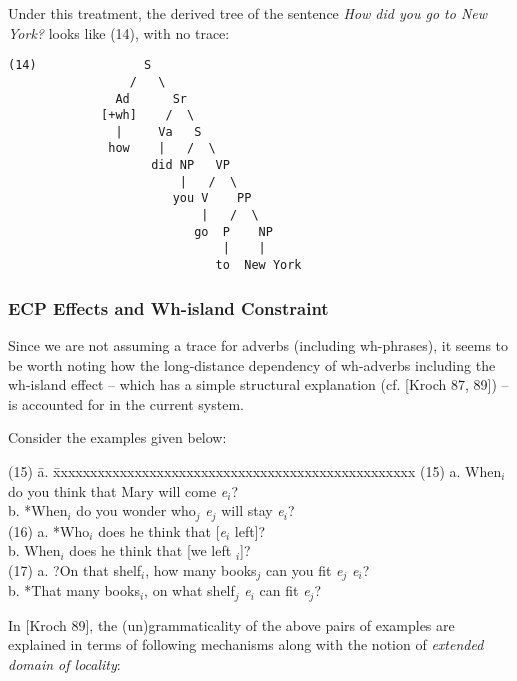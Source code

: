 Under this treatment, the derived tree of the sentence {\em How did
you go to New York?\/} looks like (14), with no trace:

\begin{verbatim}
(14)               S
                 /   \
               Ad      Sr
             [+wh]    /  \
               |     Va   S
              how    |   /  \
                    did NP   VP
                        |   /  \
                       you V    PP
                           |   /  \
                          go  P    NP
                              |    |
                             to  New York
\end{verbatim}
 
\subsubsection{ECP Effects and Wh-island Constraint}

Since we are not assuming a trace for adverbs (including wh-phrases),
it seems to be worth noting how the long-distance dependency of
wh-adverbs including the wh-island effect -- which has a simple
structural explanation (cf. [Kroch 87, 89]) -- is accounted for in the 
current system. 

Consider the examples given below:

\begin{tabbing}
(15) \= a. \= xxxxxxxxxxxxxxxxxxxxxxxxxxxxxxxxxxxxxxxxxxxxxxxxx \kill
(15) \> a. When$_{i}$ do you think that Mary will come {\em e\/}$_{i}$?\\
     \> b. *When$_{i}$ do you wonder who$_{j}$ {\em e\/}$_{j}$ will stay
{\em e\/}$_{i}$? \\
(16) \> a. \> *Who$_{i}$ does he think that [{\em e\/}$_{i}$ left]? \\
     \> b. \> When$_{i}$ does he think that [we left $_{i}$]? \\
(17) \> a. \> ?On that shelf$_{i}$, how many books$_{j}$ can you fit {\em
e\/}$_{j}$ {\em e\/}$_{i}$? \\
     \> b. \> *That many books$_{i}$, on what shelf$_{j}$ {\em e\/}$_{i}$
can fit {\em e\/}$_{j}$? 
\end{tabbing}

\noindent
In [Kroch 89], the (un)grammaticality of the above pairs of examples
are explained in terms of following mechanisms along with the notion
of {\em extended domain of locality\/}:

